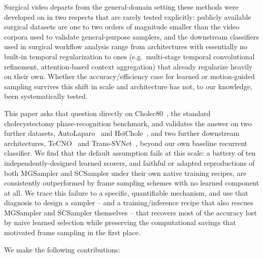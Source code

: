 \documentclass[preprint,12pt]{elsarticle}
\begin{document}
Surgical video departs from the general-domain setting these methods were developed on in two respects that are rarely tested explicitly: publicly available surgical datasets are one to two orders of magnitude smaller than the video corpora used to validate general-purpose samplers, and the downstream classifiers used in surgical workflow analysis range from architectures with essentially no built-in temporal regularization to ones (e.g.\ multi-stage temporal convolutional refinement, attention-based context aggregation) that already regularize heavily on their own. Whether the accuracy/efficiency case for learned or motion-guided sampling survives this shift in scale and architecture has not, to our knowledge, been systematically tested.

This paper asks that question directly on Cholec80~\cite{twinanda2017endonet}, the standard cholecystectomy phase-recognition benchmark, and validates the answer on two further datasets, AutoLaparo~\cite{wang2022autolaparo} and HeiChole~\cite{wagner2023heichole}, and two further downstream architectures, TeCNO~\cite{czempiel2020tecno} and Trans-SVNet~\cite{gao2021transsvnet}, beyond our own baseline recurrent classifier. We find that the default assumption fails at this scale: a battery of ten independently-designed learned scorers, and faithful or adapted reproductions of both MGSampler and SCSampler under their own native training recipes, are consistently outperformed by frame sampling schemes with no learned component at all. We trace this failure to a specific, quantifiable mechanism, and use that diagnosis to design a sampler -- and a training/inference recipe that also rescues MGSampler and SCSampler themselves -- that recovers most of the accuracy lost by naive learned selection while preserving the computational savings that motivated frame sampling in the first place.

We make the following contributions:
\end{document}
